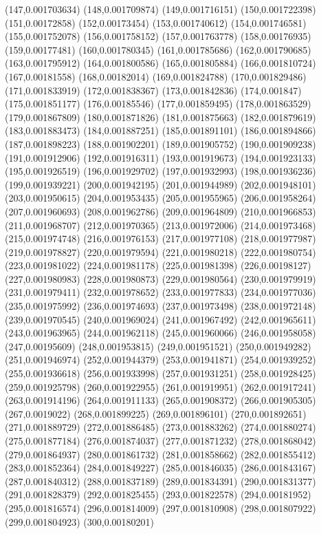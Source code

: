 (147,0.001703634)
(148,0.001709874)
(149,0.001716151)
(150,0.001722398)
(151,0.00172858)
(152,0.00173454)
(153,0.001740612)
(154,0.001746581)
(155,0.001752078)
(156,0.001758152)
(157,0.001763778)
(158,0.00176935)
(159,0.00177481)
(160,0.001780345)
(161,0.001785686)
(162,0.001790685)
(163,0.001795912)
(164,0.001800586)
(165,0.001805884)
(166,0.001810724)
(167,0.00181558)
(168,0.00182014)
(169,0.001824788)
(170,0.001829486)
(171,0.001833919)
(172,0.001838367)
(173,0.001842836)
(174,0.001847)
(175,0.001851177)
(176,0.00185546)
(177,0.001859495)
(178,0.001863529)
(179,0.001867809)
(180,0.001871826)
(181,0.001875663)
(182,0.001879619)
(183,0.001883473)
(184,0.001887251)
(185,0.001891101)
(186,0.001894866)
(187,0.001898223)
(188,0.001902201)
(189,0.001905752)
(190,0.001909238)
(191,0.001912906)
(192,0.001916311)
(193,0.001919673)
(194,0.001923133)
(195,0.001926519)
(196,0.001929702)
(197,0.001932993)
(198,0.001936236)
(199,0.001939221)
(200,0.001942195)
(201,0.001944989)
(202,0.001948101)
(203,0.001950615)
(204,0.001953435)
(205,0.001955965)
(206,0.001958264)
(207,0.001960693)
(208,0.001962786)
(209,0.001964809)
(210,0.001966853)
(211,0.001968707)
(212,0.001970365)
(213,0.001972006)
(214,0.001973468)
(215,0.001974748)
(216,0.001976153)
(217,0.001977108)
(218,0.001977987)
(219,0.001978827)
(220,0.001979594)
(221,0.001980218)
(222,0.001980754)
(223,0.001981022)
(224,0.001981178)
(225,0.001981398)
(226,0.00198127)
(227,0.001980983)
(228,0.001980873)
(229,0.001980564)
(230,0.001979919)
(231,0.001979411)
(232,0.001978652)
(233,0.001977833)
(234,0.001977036)
(235,0.001975992)
(236,0.001974693)
(237,0.001973498)
(238,0.001972148)
(239,0.001970545)
(240,0.001969024)
(241,0.001967492)
(242,0.001965611)
(243,0.001963965)
(244,0.001962118)
(245,0.001960066)
(246,0.001958058)
(247,0.00195609)
(248,0.001953815)
(249,0.001951521)
(250,0.001949282)
(251,0.001946974)
(252,0.001944379)
(253,0.001941871)
(254,0.001939252)
(255,0.001936618)
(256,0.001933998)
(257,0.001931251)
(258,0.001928425)
(259,0.001925798)
(260,0.001922955)
(261,0.001919951)
(262,0.001917241)
(263,0.001914196)
(264,0.001911133)
(265,0.001908372)
(266,0.001905305)
(267,0.0019022)
(268,0.001899225)
(269,0.001896101)
(270,0.001892651)
(271,0.001889729)
(272,0.001886485)
(273,0.001883262)
(274,0.001880274)
(275,0.001877184)
(276,0.001874037)
(277,0.001871232)
(278,0.001868042)
(279,0.001864937)
(280,0.001861732)
(281,0.001858662)
(282,0.001855412)
(283,0.001852364)
(284,0.001849227)
(285,0.001846035)
(286,0.001843167)
(287,0.001840312)
(288,0.001837189)
(289,0.001834391)
(290,0.001831377)
(291,0.001828379)
(292,0.001825455)
(293,0.001822578)
(294,0.00181952)
(295,0.001816574)
(296,0.001814009)
(297,0.001810908)
(298,0.001807922)
(299,0.001804923)
(300,0.00180201)
